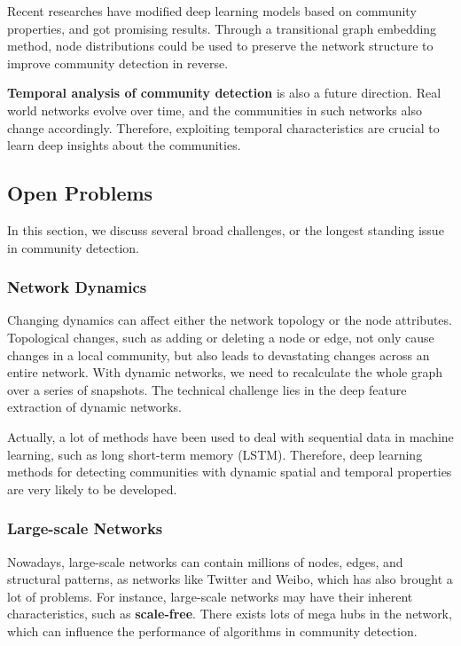 \documentclass[11pt]{article}
\begin{document}
\noindent Recent researches have modified deep learning models based on community properties, and got promising results.\cite{deep2019}
Through a transitional graph embedding method, node distributions could be used to preserve the network structure to improve community detection in reverse.

\noindent \textbf{Temporal analysis of community detection} is also a future direction. Real world networks evolve over time, and the communities in such networks also change accordingly.
Therefore, exploiting temporal characteristics are crucial to learn deep insights about the communities.

\subsection{Open Problems}
In this section, we discuss several broad challenges, or the longest standing issue in community detection.

\subsubsection{Network Dynamics}
Changing dynamics can affect either the network topology or the node attributes. Topological changes, such as adding or deleting a node or edge, not only cause changes in a local community, but also leads to devastating changes across an entire network.
With dynamic networks, we need to recalculate the whole graph over a series of snapshots. The technical challenge lies in the deep feature extraction of dynamic networks.

\noindent Actually, a lot of methods have been used to deal with sequential data in machine learning, such as long short-term memory (LSTM).\cite{lstm} Therefore, deep learning methods for detecting communities with dynamic spatial and temporal properties are very likely to be developed. 

\subsubsection{Large-scale Networks}
Nowadays, large-scale networks can contain millions of nodes, edges, and structural patterns, as networks like Twitter and Weibo, which has also brought a lot of problems. 
For instance, large-scale networks may have their inherent characteristics, such as \textbf{scale-free}. There exists lots of mega hubs in the network, which can influence the performance of algorithms in community detection.
\end{document}
